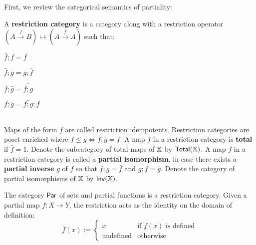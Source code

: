 First, we review the categorical semantics of partiality:
\label{sec:rest}
\begin{definition}\cite[\S 2.1.1]{cockett}
A {\bf restriction category} is a category along with a restriction operator 
$
(A \xrightarrow{f} B )\mapsto (A \xrightarrow{\bar f} A)
$
such that:\\

\noindent\hspace*{-.85cm}
\begingroup
\setlength{\columnsep}{-25pt}
\setlength{\parindent}{0pt}
\begin{minipage}{16cm}
\begin{multicols}{4}
\begin{enumerate}[label={\bf [R.\arabic*]}, ref={\bf [R.\arabic*]}, labelindent=0pt, itemsep=0pt]
\item $\bar f ; f  = f$
\label{R.1}
\item $\bar f ; \bar g = \bar g ; \bar f$
\label{R.2}
\item $\bar f ; \bar g = \bar{\bar f ;  g}$
\label{R.3}
\item $f ; \bar g = \bar{f; g} ; f$
\label{R.4}
\end{enumerate}
\end{multicols}
\end{minipage}
\endgroup\\

\noindent
Maps of the form $\bar f$ are called restriction idempotents.
Restriction categories are poset enriched where $f \leq g \iff \bar f ; g = f$.
A map $f$ in a restriction category is {\bf total} if $\bar f =1$.  Denote the subcategory of total maps of $\mathbb{X}$ by $\mathsf{Total}(\mathbb{X})$.
A map $f$ in a restriction category is called a {\bf partial isomorphism}, in case there exists a {\bf partial inverse} $g$ of $f$ so that $f;g=\bar f$ and $g;f = \bar g$. Denote the category of partial isomorphisms of $\mathbb{X}$ by $\mathsf{Inv}(\mathbb{X})$.
\end{definition}
\begin{example}
The category $\mathsf{Par}$ of sets and partial functions is a restriction category.   Given a partial map $f:X\to Y$, the restriction acts as the identity on the domain of definition:
$$
\bar f (x):=
\begin{cases}
x & \text{if }f(x)\text{ is defined}\\
\text{undefined} & \text{otherwise}
\end{cases}
$$
\end{example}
